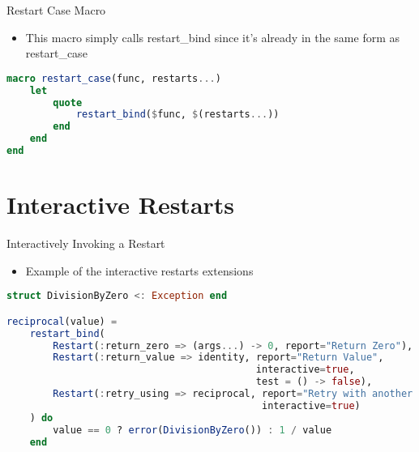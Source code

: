 \documentclass{beamer}
\begin{document}
\begin{frame}[fragile,t]{Restart Case Macro}

\begin{itemize}
    \item This macro simply calls restart\_bind since it's already in the same form as restart\_case
\end{itemize}
\vfill
\begin{lstlisting}[language=julia, style=jlcodestyle,]
macro restart_case(func, restarts...)
    let
        quote
            restart_bind($func, $(restarts...))
        end
    end
end
\end{lstlisting}
\end{frame}


\section{Interactive Restarts}
\begin{frame}[fragile,t]{Interactively Invoking a Restart}

\begin{itemize}
    \item Example of the interactive restarts extensions
\end{itemize}
\vfill

\begin{lstlisting}[language=julia, style=jlcodestyle,]
struct DivisionByZero <: Exception end

reciprocal(value) =
    restart_bind(
        Restart(:return_zero => (args...) -> 0, report="Return Zero"),
        Restart(:return_value => identity, report="Return Value",
                                           interactive=true,
                                           test = () -> false),
        Restart(:retry_using => reciprocal, report="Retry with another value",
                                            interactive=true)
    ) do
        value == 0 ? error(DivisionByZero()) : 1 / value
    end
\end{lstlisting}

\end{frame}
\end{document}
